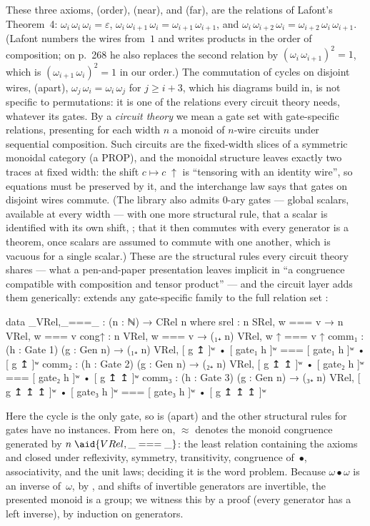 \noindent These three axioms, (order), (near), and (far), are the relations of Lafont's Theorem~4: $\omega_i\,\omega_i\,\omega_i = \varepsilon$, $\omega_i\,\omega_{i+1}\,\omega_i = \omega_{i+1}\,\omega_{i+1}$, and $\omega_i\,\omega_{i+2}\,\omega_i = \omega_{i+2}\,\omega_i\,\omega_{i+1}$. (Lafont numbers the wires from~$1$ and writes products in the order of composition; on p.~268 he also replaces the second relation by $(\omega_i\,\omega_{i+1})^2=1$, which is $(\omega_{i+1}\,\omega_i)^2=1$ in our order.) The commutation of cycles on disjoint wires, (apart), $\omega_j\,\omega_i = \omega_i\,\omega_j$ for $j \ge i+3$, which his diagrams build in, is not specific to permutations: it is one of the relations every circuit theory needs, whatever its gates. By a \emph{circuit theory} we mean a gate set with gate-specific relations, presenting for each width $n$ a monoid of $n$-wire circuits under sequential composition. Such circuits are the fixed-width slices of a symmetric monoidal category (a PROP), and the monoidal structure leaves exactly two traces at fixed width: the shift $c \mapsto c\;{\uparrow}$ is ``tensoring with an identity wire'', so equations must be preserved by it, and the interchange law says that gates on disjoint wires commute. (The library also admits $0$-ary gates --- global scalars, available at every width --- with one more structural rule, that a scalar is identified with its own shift, ; that it then commutes with every generator is a theorem, once scalars are assumed to commute with one another, which is vacuous for a single scalar.) These are the structural rules every circuit theory shares --- what a pen-and-paper presentation leaves implicit in ``a congruence compatible with composition and tensor product'' --- and the circuit layer adds them generically:  extends any gate-specific family to the full relation set :
\begin{code}
data _VRel,_===_ : (n : ℕ) → CRel n where
  srel  : n SRel, w === v → n VRel, w === v
  cong↑ : n VRel, w === v → (₁₊ n) VRel, w ↑ === v ↑
  comm₁ : (h : Gate 1) (g : Gen n) →
          (₁₊ n) VRel, [ g ↥ ]ʷ • [ gate₁ h ]ʷ === [ gate₁ h ]ʷ • [ g ↥ ]ʷ
  comm₂ : (h : Gate 2) (g : Gen n) →
          (₂₊ n) VRel, [ g ↥ ↥ ]ʷ • [ gate₂ h ]ʷ === [ gate₂ h ]ʷ • [ g ↥ ↥ ]ʷ
  comm₃ : (h : Gate 3) (g : Gen n) →
          (₃₊ n) VRel, [ g ↥ ↥ ↥ ]ʷ • [ gate₃ h ]ʷ === [ gate₃ h ]ʷ • [ g ↥ ↥ ↥ ]ʷ
\end{code}
Here the cycle is the only gate, so  is (apart) and the other structural rules for gates have no instances. From here on, $\approx$ denotes the monoid congruence generated by $n\;\aid{VRel,{\_}==={\_}}$: the least relation containing the axioms and closed under reflexivity, symmetry, transitivity, congruence of~$\bullet$, associativity, and the unit laws; deciding it is the word problem. Because $\omega \bullet \omega$ is an inverse of~$\omega$, by , and shifts of invertible generators are invertible, the presented monoid is a group; we witness this by a  proof (every generator has a left inverse), by induction on generators.

